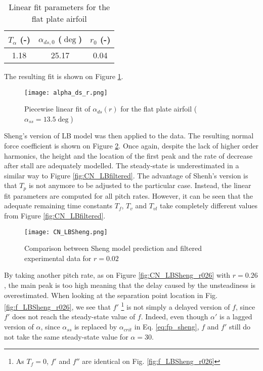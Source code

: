 \begin{table}[h]
    \centering
    \begin{tabular}{|c|c|c|}
        \hline
        $T_\alpha$ (-) & $\alpha_{ds,0}$ ($\deg$) & $r_0$ (-) \\
        \hline
        1.18 & 25.17 & 0.04 \\ 
        \hline        
    \end{tabular}
    \caption{Linear fit parameters for the flat plate airfoil}
    \label{table:linfit_flatplate}
\end{table}

The resulting fit is shown on Figure \ref{fig:alpha_ds_r}. 

\begin{figure}[h]
    \centering
    \texttt{[image: alpha\_ds\_r.png]}
    \caption{Piecewise linear fit of $\alpha_{ds}(r)$ for the flat plate airfoil ($\alpha_{ss}=13.5 \deg $)}
    \label{fig:alpha_ds_r}
\end{figure}

Sheng's version of LB model was then applied to the data. The resulting normal force coefficient is shown on Figure \ref{fig:CN_LBSheng}. Once again, despite the lack of higher order harmonics, the height and the location of the first peak and the rate of decrease after stall are adequately modelled. The steady-state is underestimated in a similar way to Figure \ref{fig:CN_LBfiltered}. The advantage of Shenh's version is that $T_p$ is not anymore to be adjusted to the particular case. Instead, the linear fit parameters are computed for all pitch rates. However, it can be seen that the adequate remaining time constants $T_f$, $T_v$ and $T_{vl}$ take completely different values from Figure \ref{fig:CN_LBfiltered}.

\begin{figure}[h]
    \centering
    \texttt{[image: CN\_LBSheng.png]}
    \caption{Comparison between Sheng model prediction and filtered experimental data for $r = 0.02$}
    \label{fig:CN_LBSheng}
\end{figure}

By taking another pitch rate, as on Figure \ref{fig:CN_LBSheng_r026} with $r=0.26$, the main peak is too high meaning that the delay caused by the unsteadiness is overestimated. When looking at the separation point location in Fig. \ref{fig:f_LBSheng_r026}, we see that $f'$ \footnote{As $T_f=0$, $f'$ and $f''$ are identical on Fig. \ref{fig:f_LBSheng_r026}} is not simply a delayed version of $f$, since $f'$ does not reach the steady-state value of $f$. Indeed, even though $\alpha'$ is a lagged version of $\alpha$, since $\alpha_{ss}$ is replaced by $\alpha_{crit}$ in Eq. \eqref{eq:fp_sheng}, $f$ and $f'$ still do not take the same steady-state value for $\alpha=30$.

